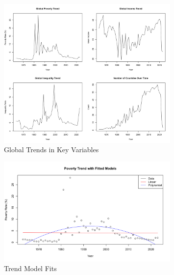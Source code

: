 \documentclass[12pt,a4paper]{article}
\begin{document}
\begin{figure}[h]
\centering
\includegraphics[width=0.8\textwidth]{../output/visualizations/global_trends.png}
\caption{Global Trends in Key Variables}
\end{figure}

\begin{figure}[h]
\centering
\includegraphics[width=0.8\textwidth]{../output/visualizations/trend_fits.png}
\caption{Trend Model Fits}
\end{figure}
\end{document}
